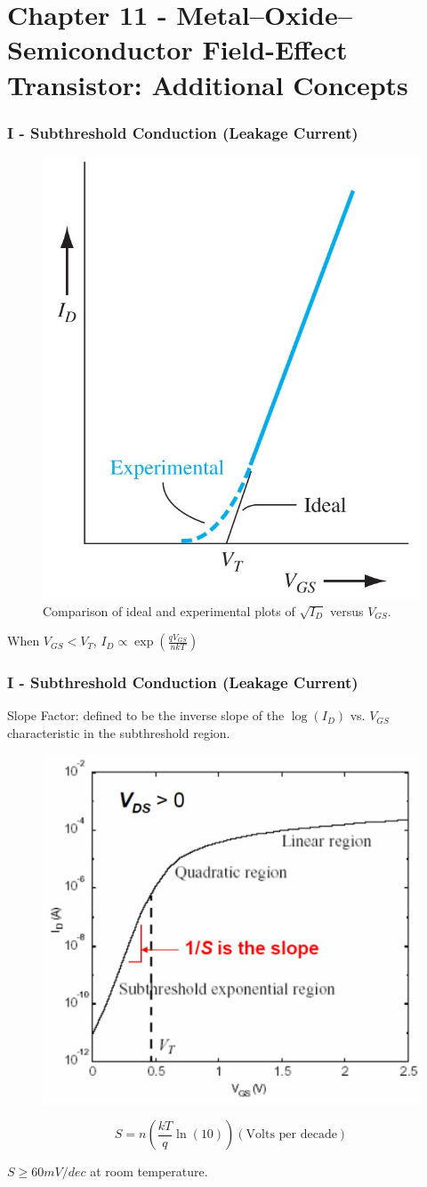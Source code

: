 \documentclass{beamer}
\begin{document}
\section{Chapter 11 - Metal–Oxide–Semiconductor Field-Effect Transistor: Additional Concepts}
    \begin{frame} \frametitle{I - Subthreshold Conduction (Leakage Current)}
        \begin{figure}[H]
            \centering
            \includegraphics[width=0.4\linewidth]{Subthreshold-condition.jpg}
            \caption{Comparison of ideal and experimental plots of $\sqrt{I_D}$ versus $V_{GS}$.}
            \label{fig:Subthreshold-condition.jpg}
        \end{figure}
        When $V_{GS} < V_T$, $I_D \propto \exp\left( \frac{qV_{GS} }{nkT}  \right)$
    \end{frame}
    \begin{frame} \frametitle{I - Subthreshold Conduction (Leakage Current)}
        Slope Factor: defined to be the inverse slope of the $\log(I_D)$ vs. $V_{GS} $ characteristic in the subthreshold region.
        \begin{figure}[H]
            \centering
            \includegraphics[width=0.6\linewidth]{Slope-factor.jpg}
            \label{fig:Slope-factor.jpg}
        \end{figure}
        \begin{equation*}
            S = n \left( \frac{kT}{q} \ln (10) \right) (\text{Volts per decade})
        \end{equation*}
        \par $S\ge 60 mV/dec$ at room temperature.
    \end{frame}
\end{document}
